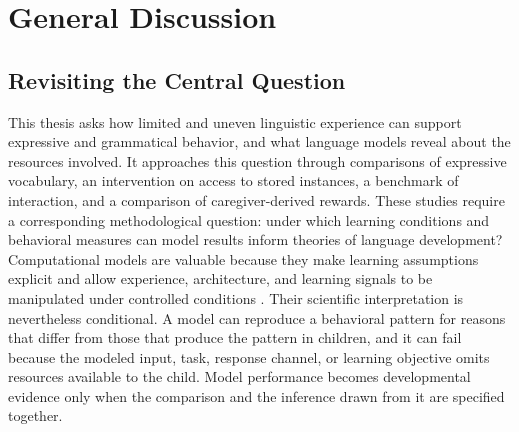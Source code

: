
\providecommand{\meCDI}{\textsc{corpus-CDI}}

\chapter{General Discussion}
\label{chap:general-discussion}


\section{Revisiting the Central Question}
\label{sec:gd_overview}

This thesis asks how limited and uneven linguistic experience can support expressive and grammatical behavior, and what language models reveal about the resources involved. It approaches this question through comparisons of expressive vocabulary, an intervention on access to stored instances, a benchmark of interaction, and a comparison of caregiver-derived rewards. These studies require a corresponding methodological question: under which learning conditions and behavioral measures can model results inform theories of language development? Computational models are valuable because they make learning assumptions explicit and allow experience, architecture, and learning signals to be manipulated under controlled conditions \citep{dupoux2018cognitive,warstadt2022what}. Their scientific interpretation is nevertheless conditional. A model can reproduce a behavioral pattern for reasons that differ from those that produce the pattern in children, and it can fail because the modeled input, task, response channel, or learning objective omits resources available to the child. Model performance becomes developmental evidence only when the comparison and the inference drawn from it are specified together.

